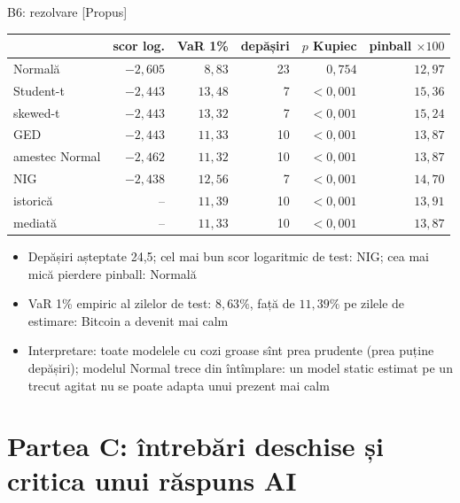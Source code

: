 \ifsolutions
\begin{frame}{B6: rezolvare [Propus]}
\itemsize{\footnotesize}
\begin{center}
\scriptsize
\begin{tabular}{lrrrrr}
\toprule
& scor log. & VaR 1\% & depășiri & $p$ Kupiec & pinball $\times 100$ \\
\midrule
Normală & $-2{,}605$ & $8{,}83$ & 23 & $0{,}754$ & $12{,}97$ \\
Student-t & $-2{,}443$ & $13{,}48$ & 7 & $<0{,}001$ & $15{,}36$ \\
skewed-t & $-2{,}443$ & $13{,}32$ & 7 & $<0{,}001$ & $15{,}24$ \\
GED & $-2{,}443$ & $11{,}33$ & 10 & $<0{,}001$ & $13{,}87$ \\
amestec Normal & $-2{,}462$ & $11{,}32$ & 10 & $<0{,}001$ & $13{,}87$ \\
NIG & $-2{,}438$ & $12{,}56$ & 7 & $<0{,}001$ & $14{,}70$ \\
istorică & -- & $11{,}39$ & 10 & $<0{,}001$ & $13{,}91$ \\
mediată & -- & $11{,}33$ & 10 & $<0{,}001$ & $13{,}87$ \\
\bottomrule
\end{tabular}
\end{center}
\begin{itemize}
    \item Depășiri așteptate 24{,}5; cel mai bun scor logaritmic de test: NIG; cea mai mică pierdere pinball: Normală
    \item VaR 1\% empiric al zilelor de test: $8{,}63\%$, față de $11{,}39\%$ pe zilele de estimare: Bitcoin a devenit mai calm
    \item Interpretare: toate modelele cu cozi groase sînt prea prudente (prea puține depășiri); modelul Normal trece din întîmplare: un model static estimat pe un trecut agitat nu se poate adapta unui prezent mai calm
\end{itemize}
\end{frame}
\fi


\section{Partea C: întrebări deschise și critica unui răspuns AI}

